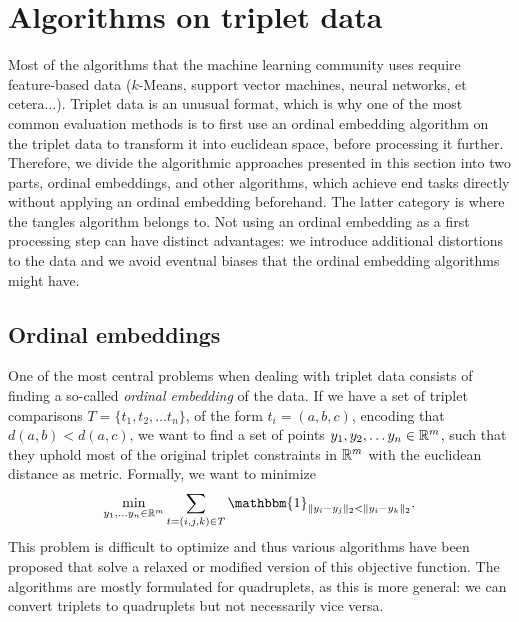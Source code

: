 \section{Algorithms on triplet data}
Most of the algorithms that the machine learning community uses require feature-based data 
($k$-Means, support vector machines, neural networks, et cetera...).
Triplet data is an unusual format, which is why one of the most common evaluation
methods is to first use an ordinal embedding algorithm on the triplet data to transform
it into euclidean space, before processing it further.  
Therefore, we divide the algorithmic approaches presented in this section into two parts, 
ordinal embeddings, and other algorithms, which achieve
end tasks directly without applying an ordinal embedding beforehand. 
The latter category is where the tangles algorithm belongs to. Not using an ordinal embedding
as a first processing step can have distinct advantages: 
we introduce additional distortions to the data and we avoid eventual biases that the ordinal embedding algorithms might have.

\subsection{Ordinal embeddings}
One of the most central problems when dealing with triplet data consists of finding a so-called \textit{ordinal embedding} of the data. If we have a set of triplet comparisons $T = \{t_1, t_2, \ldots t_n\}$, 
of the form $t_i = \left( a,b,c \right)$, encoding that $d(a,b) < d(a,c)$, 
we want to find a set of points $y_1, y_2, \ldots y_n \in \mathbb{R}^{m}$, such that they uphold most of the original triplet constraints in $\mathbb{R}^{m}$ with the euclidean distance
as metric. Formally, we want to minimize \citep{vankadaraInsightsOrdinalEmbedding2021}
\begin{align*}
    \min_{y_1, \ldots y_n \in \R^{m}} \sum_{t=\left( i,j,k \right)  \in T} \mathbbm{1}_{ \|y_i - y_j\|_2 < \|y_i - y_k\|_2 }
.\end{align*}
This problem is difficult to optimize and thus various algorithms have been proposed that solve a relaxed or modified version of this objective function. The algorithms are mostly formulated
for quadruplets, as this is more general: we can convert triplets to quadruplets but not 
necessarily vice versa.

